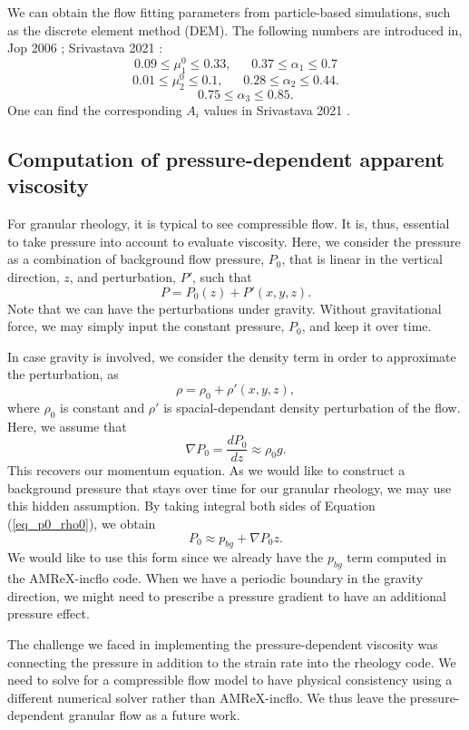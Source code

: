 We can obtain the flow fitting parameters from particle-based simulations, such as the discrete element method (DEM). The following numbers are introduced in, Jop 2006 \cite{jop_constitutive_2006}; Srivastava 2021 \cite{srivastava_viscometric_2021}:
    \[
    0.09 \leq \mu_1^0 \leq 0.33, 
    \ \ \ \ \ \ \ 
    0.37 \leq \alpha_1 \leq 0.7
    \]
        \[
    0.01 \leq \mu_2^0 \leq 0.1, 
    \ \ \ \ \ \ \ 
    0.28 \leq \alpha_2 \leq 0.44.
    \]
            \[
    \ \ \ \ \ \ \ 
    0.75 \leq \alpha_3 \leq 0.85.
    \]
     One can find the corresponding $A_i$ values in Srivastava 2021 \cite{srivastava_viscometric_2021}.
\subsection{Computation of pressure-dependent apparent viscosity}
For granular rheology, it is typical to see compressible flow. It is, thus, essential to take pressure into account to evaluate viscosity.
Here, we consider the pressure as a combination of background flow pressure, $P_0$, that is linear in the vertical direction, $z$, and perturbation, $P'$, such that
\[
P = P_0(z) + P'(x,y,z).\]
Note that we can have the perturbations under gravity. Without gravitational force, we may simply input the constant pressure, $P_0$, and keep it over time.
\par
In case gravity is involved, we consider the density term in order to approximate the perturbation, as 
\[
\rho  = \rho_0  + \rho'(x,y,z), 
\]
where $\rho_0$ is constant and $\rho'$ is spacial-dependant density perturbation of the flow. 
Here, we assume that 
\begin{equation}
    \nabla P_0  = \frac{d P_0}{d z} \approx \rho_0  g.  
\label{eq_p0_rho0}
\end{equation}
This recovers our momentum equation. As we would like to construct a background pressure that stays over time for our granular rheology, we may use this hidden assumption.
By taking integral both sides of Equation (\ref{eq_p0_rho0}), we obtain
\begin{equation}
    P_0 \approx p_{bg} + \nabla P_0 z.
\end{equation}
We would like to use this form since we already have the $p_{bg}$ term computed in the AMReX-incflo code.
%
When we have a periodic boundary in the gravity direction, we might need to prescribe a pressure gradient to have an additional pressure effect. 
\par
The challenge we faced in implementing the pressure-dependent viscosity was connecting the pressure in addition to the strain rate into the rheology code. We need to solve for a compressible flow model to have physical consistency using a different numerical solver rather than AMReX-incflo. We thus leave the pressure-dependent granular flow as a future work.


